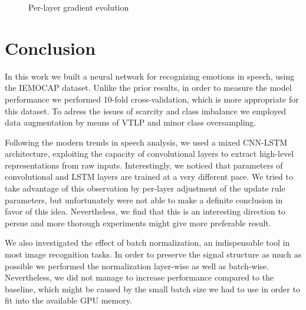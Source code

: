 \documentclass[a4paper]{article}
\begin{document}
\begin{figure}
     \centering
     \caption{Per-layer gradient evolution}
     \label{fig:grad_evol}
\end{figure}


\section{Conclusion}

In this work we built a neural network for recognizing emotions in speech, using the IEMOCAP dataset. Unlike the prior results, in order to measure the model performance 
we performed 10-fold cross-validation, which is more appropriate for this dataset.
To adress the issues of scarcity and class imbalance we employed data augmentation by means of VTLP and minor class oversampling. 

Following the modern trends in speech analysis, we used a mixed CNN-LSTM architecture, exploiting the capacity of convolutional layers to extract high-level representations 
from raw inputs. Interestingly, we noticed that parameters of convolutional and LSTM layers are trained at a very different pace. We tried to take advantage of this observation by per-layer adjustment of the update rule parameters, but unfortunately were not able to make a definite conclusion in favor of this idea. Nevertheless, we find that this is an interesting direction to persue and more thorough experiments might give more preferable result. 

We also investigated the effect of batch normalization, an indispensable tool in most image recognition tasks. In order to preserve the signal structure as much as possible 
we performed the normalization layer-wise as well as batch-wise. Nevertheless, we did not manage to increase performance compared to the baseline, which might be 
caused by the small batch size we had to use in order to fit into the available GPU memory.




\end{document}
